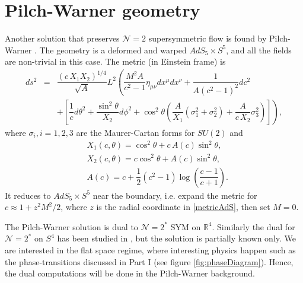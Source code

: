 \section{Pilch-Warner geometry}
Another solution that preserves $\mathcal{N}=2$ supersymmetric flow is found by Pilch-Warner \cite{Pilch:2000ue}.
The geometry is a deformed and warped $AdS_5 \times S^5$, and all the fields are non-trivial in this case.
The metric (in Einstein frame) is
\begin{eqnarray}\label{metricPW}
 ds^2 & = & \dfrac{(c \, X_1 X_2)^{1/4}}{\sqrt{A}} L^2
	\left( 
	  \dfrac{M^2 A}{c^2-1} \eta_{\mu\nu}dx^\mu dx^\nu + \dfrac{1}{A (c^2-1)^2} dc^2 
	\right.\\
      & & +\left. \left[
		  \dfrac{1}{c} d\theta^2 + \dfrac{\sin^2\theta}{X_2} d\phi^2 
		  + \cos^2\theta  \left(\dfrac{A}{X_1}(\sigma_1^2 +\sigma_2^2) + \dfrac{A}{c \, X_2} \sigma_3^2 \right)  
		\right] 
        \right),\nonumber
\end{eqnarray}
where $\sigma_i, i=1,2,3$ are the Maurer-Cartan forms for $SU(2)$ and
\begin{eqnarray*}
 & X_1(c,\theta) =  \cos^2\theta + c\, A(c)  \sin^2\theta, \\
 &  X_2 (c,\theta)=  c \cos^2\theta + A(c)  \sin^2\theta, \\
 & A(c)  = c+\dfrac{1}{2}(c^2 - 1)\log\left(\dfrac{c-1}{c+1}\right).
\end{eqnarray*}
It reduces to $AdS_5 \times S^5$ near the boundary, i.e. expand the metric for $c \approx 1 + z^2 M^2/ 2$, 
where $z$ is the radial coordinate in \eqref{metricAdS}, then set $M=0$.

The Pilch-Warner solution is dual to $\mathcal{N}=2^*$ SYM on $\mathbb{R}^4$. 
Similarly the dual for $\mathcal{N}=2^*$ on $S^4$ has been studied in \cite{Bobev:2013cja},
but the solution is partially known only.
We are interested in the flat space regime, where interesting physics happen such as the phase-transitions discussed in Part I (see figure \ref{fig:phaseDiagram}).
Hence, the dual computations will be done in the Pilch-Warner background.





